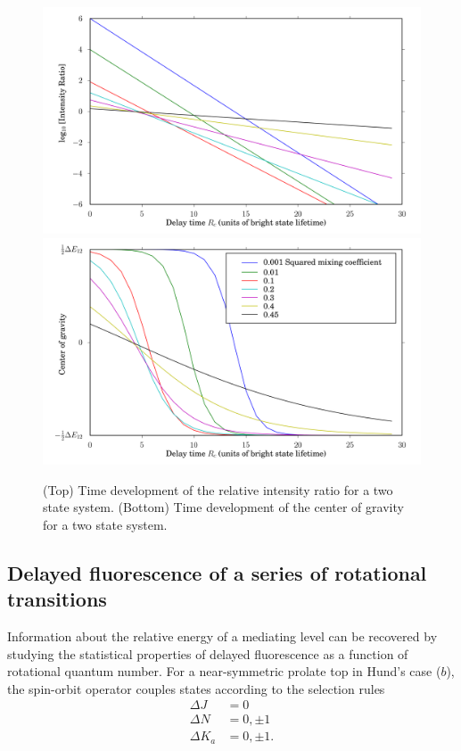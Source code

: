 \documentclass[12pt,draft]{mitthesis}
\begin{document}
\begin{figure}
  \caption{(Top) Time development of the relative intensity ratio for
    a two state system. (Bottom) Time development of the center of
    gravity for a two state system.}
  \label{fig:cog-devel}
  \centering
  \includegraphics[width=6in]{ratio-development.png}
  \includegraphics[width=6in]{cog-development.png}
\end{figure}

\subsection{Delayed fluorescence of a series of rotational
  transitions}

Information about the relative energy of a mediating level can be
recovered by studying the statistical properties of delayed
fluorescence as a function of rotational quantum number.  For a
near-symmetric prolate top in Hund's case ($b$), the spin-orbit
operator couples states according to the selection rules
\begin{equation}
  \begin{split}
    \Delta J &= 0 \\
    \Delta N &= 0, \pm 1\\
    \Delta K_a &= 0, \pm 1.
  \end{split}
\end{equation}
\end{document}
